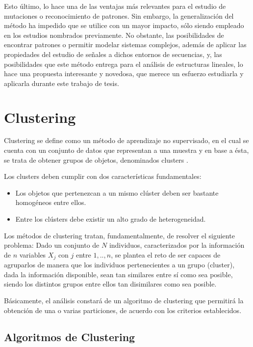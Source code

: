 Esto último, lo hace una de las ventajas más relevantes para el estudio de mutaciones o reconocimiento de patrones. Sin embargo, la generalización del método ha impedido que se utilice con un mayor impacto, sólo siendo empleado en los estudios nombrados previamente. No obstante, las posibilidades de encontrar patrones o permitir modelar sistemas complejos, además de aplicar las propiedades del estudio de señales a dichos entornos de secuencias, y, las posibilidades que este método entrega para el análisis de estructuras lineales, lo hace una propuesta interesante y novedosa, que merece un esfuerzo estudiarla y aplicarla durante este trabajo de tesis.

\section{Clustering}

Clustering se define como un método de aprendizaje no supervisado, en el cual se cuenta con un conjunto de datos que representan a una muestra y en base a ésta, se trata de obtener grupos de objetos, denominados clusters \cite{jain1999data}.

Los clusters deben cumplir con dos características fundamentales:

\begin{itemize}
	\item Los objetos que pertenezcan a un mismo clúster deben ser bastante homogéneos entre ellos.
	\item Entre los clústers debe existir un alto grado de heterogeneidad.
\end{itemize}

Los métodos de clustering tratan, fundamentalmente, de resolver el siguiente problema: Dado un conjunto de $N$ individuos, caracterizados por la información de $n$ variables $X_{j}$ con $j$ entre $1,..,n$, se plantea el reto de ser capaces de agruparlos de manera que los individuos pertenecientes a un grupo (cluster), dada la información disponible, sean tan similares entre sí como sea posible, siendo los distintos grupos entre ellos tan disimilares como sea posible.

Básicamente, el análisis constará de un algoritmo de clustering que permitirá la obtención de una o varias particiones, de acuerdo con los criterios establecidos.

\subsection{Algoritmos de Clustering}

